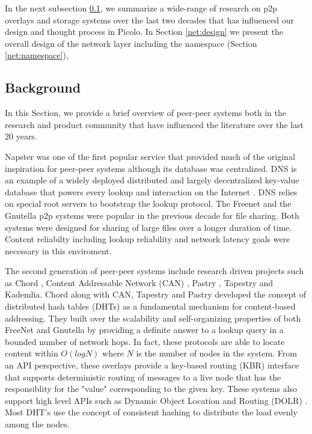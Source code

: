 In the next subsection \ref{net:background}, we summarize a wide-range of research on p2p overlays and storage systems over the last two
decades that has influenced our design and thought process in Picolo. In Section \ref{net:design} we present the overall
design of the network layer including the namespace (Section \ref{net:namespace}), 

\subsection{Background} \label{net:background}

In this Section, we provide a brief overview of peer-peer systems both in the research and product community that have
influenced the literature over the last 20 years.

Napster \cite{Napster} was one of the first popular service that provided much of the original inspiration for peer-peer
systems although its database was centralized.  DNS is an example of a widely deployed distributed and largely
decentralized key-value database that powers every lookup and interaction on the Internet \cite{Mockapetris_1988}. DNS
relies on special root servers to bootstrap the lookup protocol. The Freenet \cite{freenet_thesis, Clarke_2001} and the
Gnutella \cite{Gnutella} p2p systems were popular in the previous decade for file sharing. Both systems were designed
for sharing of large files over a longer duration of time. Content reliabilty including lookup reliability and network
latency goals were necessary in this enviroment. 

The second generation of peer-peer systems include research driven projects such as Chord \cite{Stoica_2001}, Content
Addressable Network (CAN)
\cite{Ratnasamy_2001}, Pastry \cite{Rowstron_2001}, Tapestry \cite{tapestry2004} and
Kademlia. Chord along with CAN, Tapestry and Pastry developed the concept of distributed hash tables (DHTs) as a
fundamental mechanism for content-based addressing. They built over the scalability and self-organizing properties of
both FreeNet and Gnutella by providing a definite answer to a lookup query in a bounded number of network hops. In fact,
these protocols are able to locate content within \( O(log N) \) where \(N\) is the number of nodes in the system. From
an 
API perspective, these overlays provide a key-based routing (KBR) interface that supports deterministic routing of
messages to a live node that has the responsiblity for the "value" corresponding to the given key. These systems also
support high level APIs such as Dynamic Object Location and Routing (DOLR) \cite{dolr2003}. Most DHT's use the concept
of consistent hashing to distribute the load evenly among the nodes.

